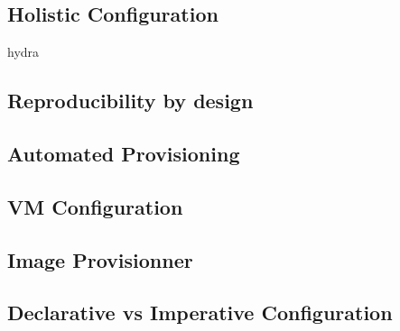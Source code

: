\subsection{Holistic Configuration}
hydra
\subsection{Reproducibility by design}
\subsection{Automated Provisioning}
\subsection{VM Configuration}
\subsection{Image Provisionner}
\subsection{Declarative vs Imperative Configuration}